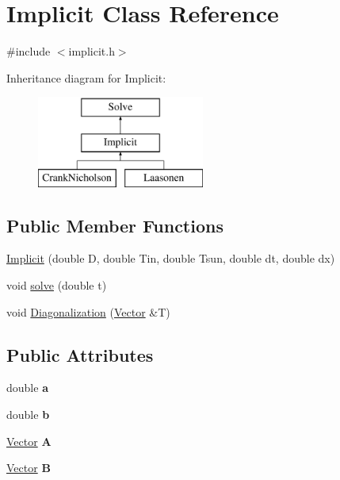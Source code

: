 \hypertarget{class_implicit}{}\section{Implicit Class Reference}
\label{class_implicit}


{\ttfamily \#include $<$implicit.\+h$>$}

Inheritance diagram for Implicit\+:\begin{figure}[H]
\begin{center}
\leavevmode
\includegraphics[height=3.000000cm]{class_implicit}
\end{center}
\end{figure}
\subsection*{Public Member Functions}
\begin{DoxyCompactItemize}
\item 
\hyperlink{class_implicit_afe5ef51232ab8925009f584c679bdfce}{Implicit} (double D, double Tin, double Tsun, double dt, double dx)
\item 
void \hyperlink{class_implicit_a027adb4276376991f75fcffbd34740b3}{solve} (double t)
\item 
void \hyperlink{class_implicit_a572fff2232977c83c432f993f37a7853}{Diagonalization} (\hyperlink{class_vector}{Vector} \&T)
\end{DoxyCompactItemize}
\subsection*{Public Attributes}
\begin{DoxyCompactItemize}
\item 
\mbox{\label{class_implicit_a58a95622ffc58ae2f468d3ef4f0d215c}} 
double {\bfseries a}
\item 
\mbox{\label{class_implicit_a270615b52e1106f89b4e6ef928cc12de}} 
double {\bfseries b}
\item 
\mbox{\label{class_implicit_a5bdc685b164fc363d26ed1461c0d49b2}} 
\hyperlink{class_vector}{Vector} {\bfseries A}
\item 
\mbox{\label{class_implicit_a3f9c9eda634c19c2301698fd81ec5a6b}} 
\hyperlink{class_vector}{Vector} {\bfseries B}
\end{DoxyCompactItemize}


